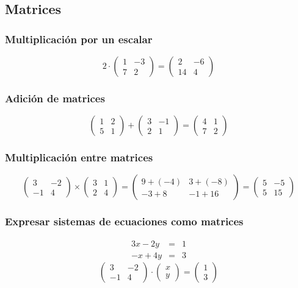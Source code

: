 \documentclass[11pt, twocolumn, landscape, a4paper]{article}
\begin{document}
\subsection*{Matrices}

\subsubsection*{Multiplicación por un escalar}
$$
2 \cdot \begin{pmatrix} 1 & -3 \\ 7 & 2 \end{pmatrix} = \begin{pmatrix} 2 & -6 \\ 14 & 4 \end{pmatrix}
$$

\subsubsection*{Adición de matrices}
\[
\begin{pmatrix} 1 & 2 \\ 5 & 1\end{pmatrix} + \begin{pmatrix} 3 & -1 \\ 2 & 1 \end{pmatrix} = \begin{pmatrix} 4 & 1 \\ 7 & 2 \end{pmatrix}
\]

\subsubsection*{Multiplicación entre matrices}
\[
\begin{pmatrix} 3 & -2 \\ -1 & 4\end{pmatrix} \times \begin{pmatrix} 3 & 1 \\ 2 & 4 \end{pmatrix} = \begin{pmatrix} 9 + (-4) & 3 + (-8) \\ -3 + 8 & -1 + 16 \end{pmatrix} = \begin{pmatrix} 5 & -5 \\ 5 & 15 \end{pmatrix}
\]
\subsubsection*{Expresar sistemas de ecuaciones como matrices}
\begin{eqnarray*}
3x - 2y &=& 1 \\
-x + 4y &=& 3
\end{eqnarray*}
\[
\begin{pmatrix} 3 & -2 \\ -1 & 4\end{pmatrix} \cdot \begin{pmatrix} x \\ y \end{pmatrix} = \begin{pmatrix} 1 \\ 3 \end{pmatrix}
\]
\end{document}
